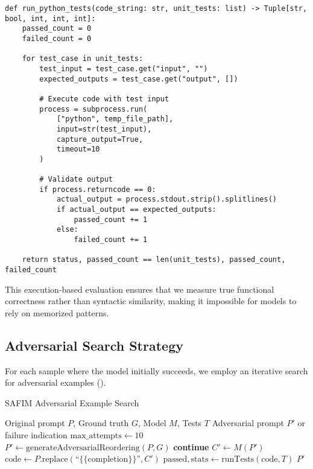 \documentclass[%
thesis=student,%
coverpage=false,%
titlepage=false,%
headmarks=true, %
english,%
font=libertine, %
math=newpxtx, %
BCOR=5mm,%
coverBCOR=11mm%
]{tum-templates/book/tumbook}
\begin{document}
\begin{lstlisting}[style=pythonstyle, caption={Unit Test Execution}]
def run_python_tests(code_string: str, unit_tests: list) -> Tuple[str, bool, int, int, int]:
    passed_count = 0
    failed_count = 0
    
    for test_case in unit_tests:
        test_input = test_case.get("input", "")
        expected_outputs = test_case.get("output", [])
        
        # Execute code with test input
        process = subprocess.run(
            ["python", temp_file_path],
            input=str(test_input),
            capture_output=True,
            timeout=10
        )
        
        # Validate output
        if process.returncode == 0:
            actual_output = process.stdout.strip().splitlines()
            if actual_output == expected_outputs:
                passed_count += 1
            else:
                failed_count += 1
                
    return status, passed_count == len(unit_tests), passed_count, failed_count
\end{lstlisting}
This execution-based evaluation ensures that we measure true functional correctness rather than syntactic similarity, making it impossible for models to rely on memorized patterns.

\subsection{Adversarial Search Strategy}

For each sample where the model initially succeeds, we employ an iterative search for adversarial examples ().


\begin{algorithm}[htbp]
\caption{SAFIM Adversarial Example Search}
\label{alg:safim-adversarial}
\begin{algorithmic}[1]
\Require Original prompt $P$, Ground truth $G$, Model $M$, Tests $T$
\Ensure Adversarial prompt $P'$ or failure indication
\State $\text{max\_attempts} \gets 10$
    \State $P' \gets \text{generateAdversarialReordering}(P, G)$
        \State \textbf{continue} 
    \EndIf
    \State $C' \gets M(P')$ 
    \State $\text{code} \gets P.\text{replace}(\text{``\{\{completion\}\}''}, C')$
    \State $\text{passed}, \text{stats} \gets \text{runTests}(\text{code}, T)$
        \State \Return $P'$ 
    \EndIf
\EndFor
\State \Return {} 
\end{algorithmic}
\end{algorithm}
\end{document}
